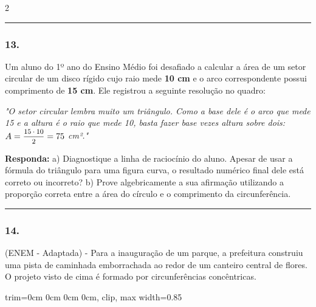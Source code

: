 \documentclass[twoside, 10pt, a4paper]{article}
\newlength{\espacoPreQuestao}\setlength{\espacoPreQuestao}{0.1cm}
\newlength{\espacoQuestao}\setlength{\espacoQuestao}{0.2cm}
\newcommand{\larguraTikz}{0.85\linewidth}
\begin{document}
\begin{multicols*}{2}
\noindent\textcolor{CorLinha}{\rule{\linewidth}{0.5pt}} 
\par\vspace{\espacoPreQuestao}
\subsubsection*{13.} Um aluno do 1º ano do Ensino Médio foi desafiado a calcular a área de um setor circular de um disco rígido cujo raio mede \textbf{10 cm} e o arco correspondente possui comprimento de \textbf{15 cm}. Ele registrou a seguinte resolução no quadro:

\textit{"O setor circular lembra muito um triângulo. Como a base dele é o arco que mede 15 e a altura é o raio que mede 10, basta fazer base vezes altura sobre dois: $A = \mfrac{15 \cdot 10}{2} = 75$ cm²."}

\begin{boxresponda}
\textbf{Responda:} 
a) Diagnostique a linha de raciocínio do aluno. Apesar de usar a fórmula do triângulo para uma figura curva, o resultado numérico final dele está correto ou incorreto? 
b) Prove algebricamente a sua afirmação utilizando a proporção correta entre a área do círculo e o comprimento da circunferência.
\end{boxresponda}
\par\vspace{\espacoQuestao}

\noindent\textcolor{CorLinha}{\rule{\linewidth}{0.5pt}} 
\par\vspace{\espacoPreQuestao}
\subsubsection*{14.} (ENEM - Adaptada) - Para a inauguração de um parque, a prefeitura construiu uma pista de caminhada emborrachada ao redor de um canteiro central de flores. O projeto visto de cima é formado por circunferências concêntricas. 
\begin{center}
\begin{adjustbox}{trim=0cm 0cm 0cm 0cm, clip, max width=\larguraTikz}
\end{adjustbox}
\end{center}
\end{multicols*}
\end{document}
